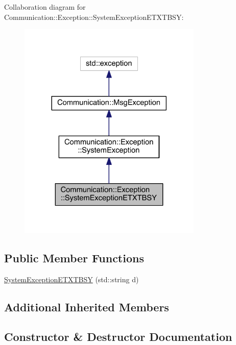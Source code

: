 Collaboration diagram for Communication\+:\+:Exception\+:\+:System\+Exception\+E\+T\+X\+T\+B\+S\+Y\+:\nopagebreak
\begin{figure}[H]
\begin{center}
\leavevmode
\includegraphics[width=248pt]{class_communication_1_1_exception_1_1_system_exception_e_t_x_t_b_s_y__coll__graph}
\end{center}
\end{figure}
\subsection*{Public Member Functions}
\begin{DoxyCompactItemize}
\item 
\hyperlink{class_communication_1_1_exception_1_1_system_exception_e_t_x_t_b_s_y_ac195ddc96a80b8330b36817d82090999}{System\+Exception\+E\+T\+X\+T\+B\+S\+Y} (std\+::string d)
\end{DoxyCompactItemize}
\subsection*{Additional Inherited Members}


\subsection{Constructor \& Destructor Documentation}
\hypertarget{class_communication_1_1_exception_1_1_system_exception_e_t_x_t_b_s_y_ac195ddc96a80b8330b36817d82090999}{}
